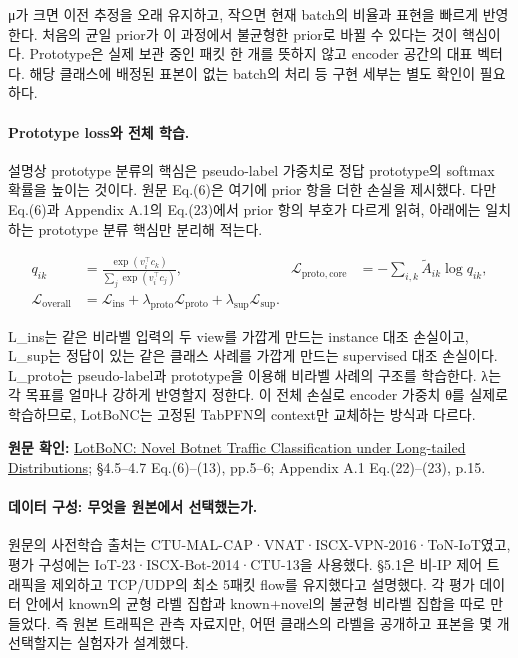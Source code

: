μ가 크면 이전 추정을 오래 유지하고, 작으면 현재 batch의 비율과 표현을 빠르게 반영한다. 처음의 균일 prior가 이 과정에서 불균형한 prior로 바뀔 수 있다는 것이 핵심이다. Prototype은 실제 보관 중인 패킷 한 개를 뜻하지 않고 encoder 공간의 대표 벡터다. 해당 클래스에 배정된 표본이 없는 batch의 처리 등 구현 세부는 별도 확인이 필요하다.


\paragraph{Prototype loss와 전체 학습.} 설명상 prototype 분류의 핵심은 pseudo-label 가중치로 정답 prototype의 softmax 확률을 높이는 것이다. 원문 Eq.(6)은 여기에 prior 항을 더한 손실을 제시했다. 다만 Eq.(6)과 Appendix A.1의 Eq.(23)에서 prior 항의 부호가 다르게 읽혀, 아래에는 일치하는 prototype 분류 핵심만 분리해 적는다.


\begin{align}
       q_{ik}&=\frac{\exp(v_i^\top c_k)}{\sum_j\exp(v_i^\top c_j)},&
       \mathcal L_{\mathrm{proto,core}}&=-\sum_{i,k}\widetilde A_{ik}\log q_{ik},\\
       \mathcal L_{\mathrm{overall}}
       &=\mathcal L_{\mathrm{ins}}+\lambda_{\mathrm{proto}}\mathcal L_{\mathrm{proto}}
                              +\lambda_{\mathrm{sup}}\mathcal L_{\mathrm{sup}}.
    \end{align}

L\_\allowbreak{}ins는 같은 비라벨 입력의 두 view를 가깝게 만드는 instance 대조 손실이고, L\_\allowbreak{}sup는 정답이 있는 같은 클래스 사례를 가깝게 만드는 supervised 대조 손실이다. L\_\allowbreak{}proto는 pseudo-label과 prototype을 이용해 비라벨 사례의 구조를 학습한다. λ는 각 목표를 얼마나 강하게 반영할지 정한다. 이 전체 손실로 encoder 가중치 θ를 실제로 학습하므로, LotBoNC는 고정된 TabPFN의 context만 교체하는 방식과 다르다.


{\small\textbf{원문 확인:} \href{https://doi.org/10.1145/3779208.3785276}{LotBoNC: Novel Botnet Traffic Classification under Long-tailed Distributions}; §4.5–4.7 Eq.(6)–(13), pp.5–6; Appendix A.1 Eq.(22)–(23), p.15.}\par

\paragraph{데이터 구성: 무엇을 원본에서 선택했는가.} 원문의 사전학습 출처는 CTU-MAL-CAP·VNAT·ISCX-VPN-2016·ToN-IoT였고, 평가 구성에는 IoT-23·ISCX-Bot-2014·CTU-13을 사용했다. §5.1은 비-IP 제어 트래픽을 제외하고 TCP/\allowbreak{}UDP의 최소 5패킷 flow를 유지했다고 설명했다. 각 평가 데이터 안에서 known의 균형 라벨 집합과 known+\allowbreak{}novel의 불균형 비라벨 집합을 따로 만들었다. 즉 원본 트래픽은 관측 자료지만, 어떤 클래스의 라벨을 공개하고 표본을 몇 개 선택할지는 실험자가 설계했다.


